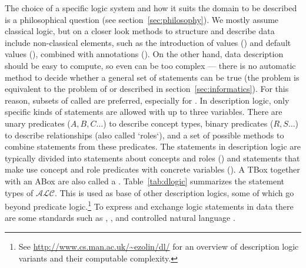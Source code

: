 The choice of a specific logic system and how it suits the domain to be
described is a philosophical question (see section~\ref{sec:philosophy}).  We
mostly assume classical logic, but on a closer look methods to structure and
describe data include non-classical elements, such as the introduction of
 values () and default values (), combined with annotations (). On the other
hand, data description should be easy to compute, so even  can be too complex --- there is no automatic method to decide
whether a general set of statements can be true (the problem is equivalent to
the problem of  or  described in
section~\ref{sec:informatics}). For this reason, subsets of  called  are preferred, especially for
 \cite{Baader2010}. In description logic, only
specific kinds of statements are allowed with up to three variables. There are
unary predicates ($A, B, C\ldots$) to describe concept types, binary predicates
($R, S\ldots$) to describe relationships (also called `roles`), and a set of
possible methods to combine statements from these predicates. The statements in
description logic are typically divided into statements about concepts and
roles () and statements that make use concept and role predicates
with concrete variables ().  A TBox together with an ABox are also
called a .  Table~\ref{tab:dlogic} summarizes the
statement types of $\mathcal{ALC}$. This  is used as base of other description logics, some of which go
beyond predicate logic.\footnote{See \url{http://www.cs.man.ac.uk/~ezolin/dl/}
for an overview of description logic variants and their computable complexity.}
%
To express and exchange logic statements in data there are some standards such
as  \cite{ISO24707:2007}, 
\cite{Sowa1992,Sowa2000}, and controlled natural language \cite{Fuchs1999}.

